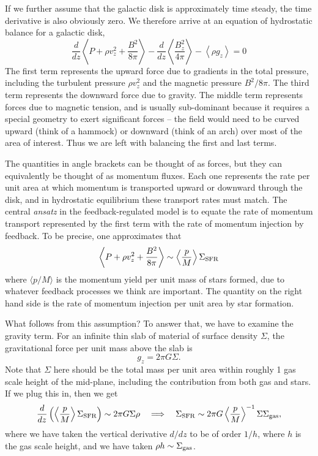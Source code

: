 If we further assume that the galactic disk is approximately time steady, the time derivative is also obviously zero. We therefore arrive at an equation of hydrostatic balance for a galactic disk,
\begin{equation}
\frac{d}{dz} \left\langle P + \rho v_z^2 + \frac{B^2}{8\pi}\right \rangle  - \frac{d}{dz} \left\langle\frac{B_z^2}{4\pi}\right\rangle - \left\langle \rho g_z\right\rangle = 0
\end{equation}
The first term represents the upward force due to gradients in the total pressure, including the turbulent pressure $\rho v_z^2$ and the magnetic pressure $B^2/8\pi$. The third term represents the downward force due to gravity. The middle term represents forces due to magnetic tension, and is usually sub-dominant because it requires a special geometry to exert significant forces -- the field would need to be curved upward (think of a hammock) or downward (think of an arch) over most of the area of interest. Thus we are left with balancing the first and last terms.

The quantities in angle brackets can be thought of as forces, but they can equivalently be thought of as momentum fluxes. Each one represents the rate per unit area at which momentum is transported upward or downward through the disk, and in hydrostatic equilibrium these transport rates must match. The central \textit{ansatz} in the feedback-regulated model is to equate the rate of momentum transport represented by the first term with the rate of momentum injection by feedback. To be precise, one approximates that
\begin{equation}
\left \langle P + \rho v_z^2 + \frac{B^2}{8\pi}\right \rangle \sim \left\langle\frac{p}{M}\right\rangle \Sigma_{\rm SFR}
\end{equation}
where $\langle p/M\rangle$ is the momentum yield per unit mass of stars formed, due to whatever feedback processes we think are important. The quantity on the right hand side is the rate of momentum injection per unit area by star formation.

What follows from this assumption? To answer that, we have to examine the gravity term. For an infinite thin slab of material of surface density $\Sigma$, the gravitational force per unit mass above the slab is
\begin{equation}
g_z = 2\pi G \Sigma.
\end{equation}
Note that $\Sigma$ here should be the total mass per unit area within roughly 1 gas scale height of the mid-plane, including the contribution from both gas and stars. If we plug this in, then we get
\begin{equation}
\frac{d}{dz} \left(\left\langle \frac{p}{M}\right\rangle \Sigma_{\rm SFR}\right) \sim 2\pi G \Sigma \rho
\quad \Longrightarrow \quad
\Sigma_{\rm SFR} \sim 2\pi G \left\langle \frac{p}{M}\right\rangle^{-1} \Sigma \Sigma_{\rm gas} ,
\end{equation}
where we have taken the vertical derivative $d/dz$ to be of order $1/h$, where $h$ is the gas scale height, and we have taken $\rho h \sim \Sigma_{\rm gas}$.

